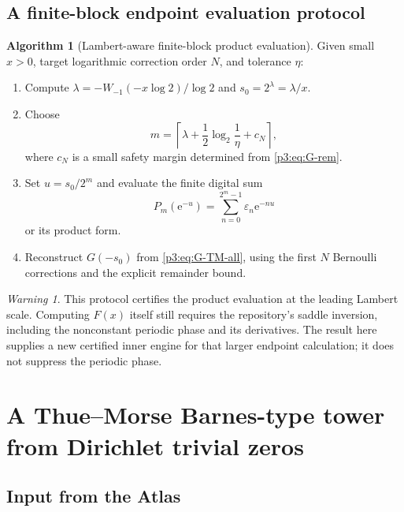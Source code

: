 \documentclass[11pt,oneside]{article}
\numberwithin{equation}{section}
\theoremstyle{definition}
\newtheorem{algorithm}[theorem]{Algorithm}
\theoremstyle{remark}
\newtheorem{warning}[theorem]{Warning}
\newcommand{\e}{\mathrm e}
\newcommand{\eps}{\varepsilon}
\begin{document}
\subsection{A finite-block endpoint evaluation protocol}

\begin{algorithm}[Lambert-aware finite-block product evaluation]
\label{p3:alg:Lambert}
Given small $x>0$, target logarithmic correction order $N$, and tolerance $\eta$:
\begin{enumerate}
\item Compute $\lambda=-W_{-1}(-x\log2)/\log2$ and $s_0=2^\lambda=\lambda/x$.
\item Choose
\[
 m=\left\lceil\lambda+\frac12\log_2\frac1\eta+c_N\right\rceil,
\]
where $c_N$ is a small safety margin determined from \eqref{p3:eq:G-rem}.
\item Set $u=s_0/2^m$ and evaluate the finite digital sum
\[
 P_m(\e^{-u})=\sum_{n=0}^{2^m-1}\eps_n\e^{-nu}
\]
or its product form.
\item Reconstruct $G(-s_0)$ from \eqref{p3:eq:G-TM-all}, using the first $N$ Bernoulli
corrections and the explicit remainder bound.
\end{enumerate}
\end{algorithm}

\begin{warning}
This protocol certifies the product evaluation at the leading Lambert scale.  Computing
$F(x)$ itself still requires the repository's saddle inversion, including the nonconstant
periodic phase and its derivatives.  The result here supplies a new certified inner engine
for that larger endpoint calculation; it does not suppress the periodic phase.
\end{warning}

\section{A Thue--Morse Barnes-type tower from Dirichlet trivial zeros}
\label{p3:sec:gamma-tower}

\subsection{Input from the Atlas}
\end{document}
